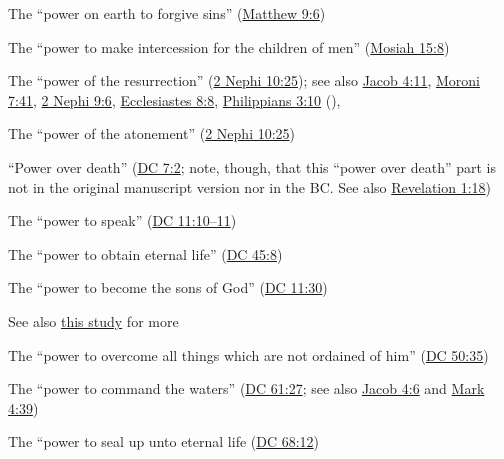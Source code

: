 		\begin{compactitem}
		
			\item The ``power on earth to forgive sins'' (\hyperref[MATTHEW-9-6]{Matthew 9:6})
			
			\item The ``power to make intercession for the children of men'' (\hyperref[MOSIAH-15-8]{Mosiah 15:8})
			
			\item The ``power of the resurrection'' (\hyperref[2NEPHI-10-25]{2 Nephi 10:25}); see also \hyperref[JACOB-4-11]{Jacob 4:11}, \hyperref[MORONI-7-41]{Moroni 7:41}, \hyperref[2NEPHI-9-6]{2 Nephi 9:6}, \hyperref[ECCLESIASTES-8-8]{Ecclesiastes 8:8}, \hyperref[PHILIPPIANS-3-10]{Philippians 3:10} (),
			
			\item The ``power of the atonement'' (\hyperref[2NEPHI-10-25]{2 Nephi 10:25})
			
			\item ``Power over death'' (\hyperref[DC7-2]{DC 7:2}; note, though, that this ``power over death'' part is not in the original manuscript version nor in the BC. See also \hyperref[REVELATIONNT-1-18]{Revelation 1:18})
			
			\item The ``power to speak'' (\hyperref[DC11-10]{DC 11:10--11})
			
			\item The ``power to obtain eternal life'' (\hyperref[DC45-8]{DC 45:8})
			
			\item The ``power to become the sons of God'' (\hyperref[DC11-30]{DC 11:30})
				\begin{compactitem}
					\item See also \hyperref[NEWBIRTH-sons]{this study} for more
				\end{compactitem} 
			
			\item The ``power to overcome all things which are not ordained of him'' (\hyperref[DC50-35]{DC 50:35})
			
			\item The ``power to command the waters'' (\hyperref[DC61-27]{DC 61:27}; see also \hyperref[JACOB-4-6]{Jacob 4:6} and \hyperref[MARK-4-39]{Mark 4:39})
			
			\item The ``power to seal up unto eternal life (\hyperref[DC68-12]{DC 68:12})
			
		\end{compactitem}
		

